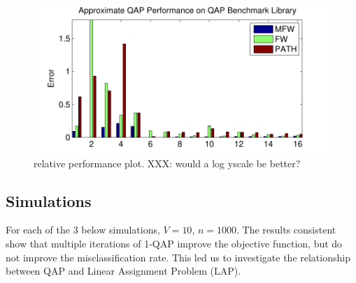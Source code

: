 \documentclass{article} %
\begin{document}
\begin{figure}[htbp]
	\centering			
	\includegraphics[width=1.0\linewidth]{../figs/benchmarks.pdf}
	\caption{relative performance plot. XXX: would a log yscale be better?}
	\label{fig:fwpath}
\end{figure}




\subsection{Simulations}

For each of the 3 below simulations, $V=10$, $n=1000$.  The results consistent show that multiple iterations of 1-QAP improve the objective function, but do not improve the misclassification rate.  This led us to investigate the relationship between QAP and Linear Assignment Problem (LAP).
\end{document}
